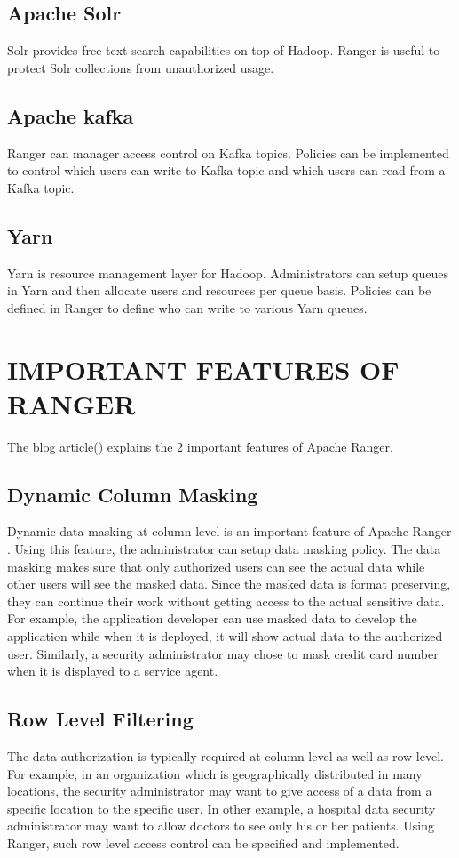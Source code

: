 \documentclass[9pt,twocolumn,twoside]{styles/osajnl}
\begin{document}
\subsection{Apache Solr}
Solr provides free text search capabilities on top of Hadoop. Ranger is
useful to protect Solr collections from unauthorized usage.

\subsection{Apache kafka}
Ranger can manager access control on Kafka topics. Policies can be
implemented to control which users can write to Kafka topic and which users
can read from a Kafka topic.

\subsection{Yarn}
Yarn is resource management layer for Hadoop. Administrators can setup queues
 in Yarn and then allocate users and resources per queue basis. Policies can
 be defined in Ranger to define who can write to various Yarn queues.

\section{IMPORTANT FEATURES OF RANGER}
The blog article(\cite{www-ranger-key-features}) explains the 2 important
features of Apache Ranger.

\subsection{Dynamic Column Masking}
Dynamic data masking at column level is an important feature of Apache Ranger
. Using this feature, the administrator can setup data masking policy. The
data masking makes sure that only authorized users can see the actual data
while other users will see the masked data. Since the masked data is format
preserving, they can continue their work without getting access to the actual
 sensitive data. For example, the application developer can use masked data
 to develop the application while when it is deployed, it will show actual
 data to the authorized user. Similarly, a security administrator may chose
 to mask credit card number when it is displayed to a service agent.

\subsection{Row Level Filtering}
The data authorization is typically required at column level as well as row
level. For example, in an organization which is geographically distributed in
 many locations, the security administrator may want to give access of a data
  from a specific location to the specific user. In other example, a
  hospital data security administrator may want to allow doctors to see
  only his or her patients. Using Ranger, such row level access control can
  be specified and implemented.
\end{document}
